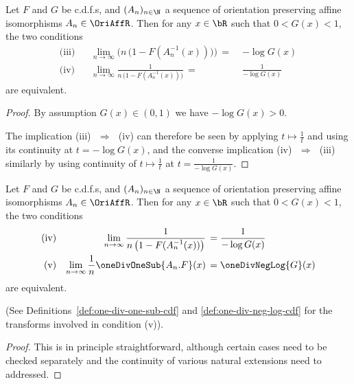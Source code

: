 \begin{lemma}
  \label{lem:inv-taylored-ev-limit}
  \leanok
  Let $F$ and $G$ be c.d.f.s, and $(A_n)_{n \in \N}$ a sequence of orientation
  preserving affine isomorphisms $A_n \in \OriAffR$. Then for any $x \in \bR$
  such that $0 < G(x) < 1$, the two conditions
  \begin{align*}
    \text{(iii)} & & \lim_{n \to \infty} \Big( n \, \big(1 - F (A_n^{-1}(x)) \big) \Big)
      \, = \; & - \log G(x) \\
    \text{(iv)} & & \lim_{n \to \infty} \frac{1}{n \, \big(1 - F (A_n^{-1}(x)) \big)}
      \, = \; & \frac{1}{-\log G(x)}
  \end{align*}
  are equivalent.
\end{lemma}
\begin{proof}
  \leanok
  By assumption $G(x) \in (0,1)$ we have $-\log G(x) > 0$.

  The implication {(iii)~$\,\Rightarrow \,$~(iv)}
  can therefore be seen by applying $t \mapsto \frac{1}{t}$
  and using its continuity at $t = -\log G(x)$, and the
  converse implication {(iv)~$\,\Rightarrow \,$~(iii)} similarly by using continuity of
  $t \mapsto \frac{1}{t}$ at $t = \frac{1}{-\log G(x)}$.
\end{proof}

\begin{lemma}
  \label{lem:transformed-ev-limit}
  \leanok
  Let $F$ and $G$ be c.d.f.s, and $(A_n)_{n \in \N}$ a sequence of orientation
  preserving affine isomorphisms $A_n \in \OriAffR$. Then for any $x \in \bR$
  such that $0 < G(x) < 1$, the two conditions
  \begin{align*}
    \text{(iv)} & & \lim_{n \to \infty} \frac{1}{n \, \big(1 - F (A_n^{-1}(x)) \big)}
      \, = \; & \frac{1}{-\log G(x)} \\
    \text{(v)} & & \lim_{n \to \infty} \frac{1}{n} \oneDivOneSub{A_n . F} (x)
      \, = \; & \oneDivNegLog{G} (x)
  \end{align*}
  are equivalent.

  (See Definitions~\ref{def:one-div-one-sub-cdf}
  and \ref{def:one-div-neg-log-cdf} for the transforms involved in condition (v)).
\end{lemma}
\begin{proof}
  \leanok
  This is in principle straightforward, although certain cases need to be checked
  separately and the continuity of various natural extensions need to addressed.
\end{proof}

